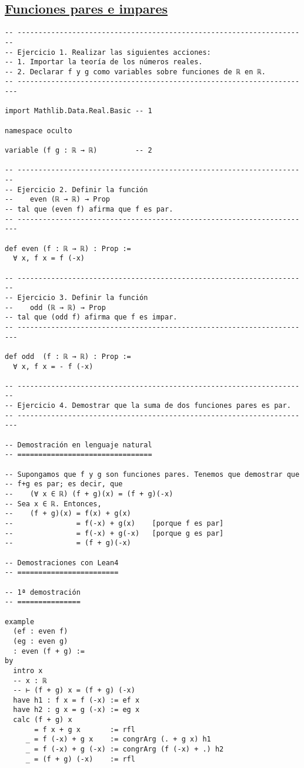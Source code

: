 \subsection{\href{./src/Logica/Funciones\_pares\_e\_impares.lean}{Funciones pares e impares}}
\label{sec:org0969d46}
\begin{verbatim}
-- ---------------------------------------------------------------------
-- Ejercicio 1. Realizar las siguientes acciones:
-- 1. Importar la teoría de los números reales.
-- 2. Declarar f y g como variables sobre funciones de ℝ en ℝ.
-- ----------------------------------------------------------------------

import Mathlib.Data.Real.Basic -- 1

namespace oculto

variable (f g : ℝ → ℝ)         -- 2

-- ---------------------------------------------------------------------
-- Ejercicio 2. Definir la función
--    even (ℝ → ℝ) → Prop
-- tal que (even f) afirma que f es par.
-- ----------------------------------------------------------------------

def even (f : ℝ → ℝ) : Prop :=
  ∀ x, f x = f (-x)

-- ---------------------------------------------------------------------
-- Ejercicio 3. Definir la función
--    odd (ℝ → ℝ) → Prop
-- tal que (odd f) afirma que f es impar.
-- ----------------------------------------------------------------------

def odd  (f : ℝ → ℝ) : Prop :=
  ∀ x, f x = - f (-x)

-- ---------------------------------------------------------------------
-- Ejercicio 4. Demostrar que la suma de dos funciones pares es par.
-- ----------------------------------------------------------------------

-- Demostración en lenguaje natural
-- ================================

-- Supongamos que f y g son funciones pares. Tenemos que demostrar que
-- f+g es par; es decir, que
--    (∀ x ∈ ℝ) (f + g)(x) = (f + g)(-x)
-- Sea x ∈ ℝ. Entonces,
--    (f + g)(x) = f(x) + g(x)
--               = f(-x) + g(x)    [porque f es par]
--               = f(-x) + g(-x)   [porque g es par]
--               = (f + g)(-x)

-- Demostraciones con Lean4
-- ========================

-- 1ª demostración
-- ===============

example
  (ef : even f)
  (eg : even g)
  : even (f + g) :=
by
  intro x
  -- x : ℝ
  -- ⊢ (f + g) x = (f + g) (-x)
  have h1 : f x = f (-x) := ef x
  have h2 : g x = g (-x) := eg x
  calc (f + g) x
       = f x + g x       := rfl
     _ = f (-x) + g x    := congrArg (. + g x) h1
     _ = f (-x) + g (-x) := congrArg (f (-x) + .) h2
     _ = (f + g) (-x)    := rfl


\end{verbatim}
